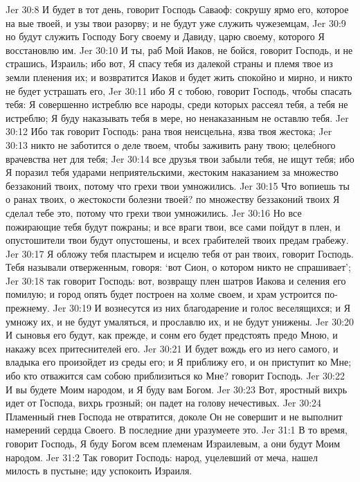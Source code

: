 Jer 30:8  И будет в тот день, говорит Господь Саваоф: сокрушу ярмо его, которое на вые твоей, и узы твои разорву; и не будут уже служить чужеземцам,
Jer 30:9  но будут служить Господу Богу своему и Давиду, царю своему, которого Я восстановлю им.
Jer 30:10  И ты, раб Мой Иаков, не бойся, говорит Господь, и не страшись, Израиль; ибо вот, Я спасу тебя из далекой страны и племя твое из земли пленения их; и возвратится Иаков и будет жить спокойно и мирно, и никто не будет устрашать его,
Jer 30:11  ибо Я с тобою, говорит Господь, чтобы спасать тебя: Я совершенно истреблю все народы, среди которых рассеял тебя, а тебя не истреблю; Я буду наказывать тебя в мере, но ненаказанным не оставлю тебя.
Jer 30:12  Ибо так говорит Господь: рана твоя неисцельна, язва твоя жестока;
Jer 30:13  никто не заботится о деле твоем, чтобы заживить рану твою; целебного врачевства нет для тебя;
Jer 30:14  все друзья твои забыли тебя, не ищут тебя; ибо Я поразил тебя ударами неприятельскими, жестоким наказанием за множество беззаконий твоих, потому что грехи твои умножились.
Jer 30:15  Что вопиешь ты о ранах твоих, о жестокости болезни твоей? по множеству беззаконий твоих Я сделал тебе это, потому что грехи твои умножились.
Jer 30:16  Но все пожирающие тебя будут пожраны; и все враги твои, все сами пойдут в плен, и опустошители твои будут опустошены, и всех грабителей твоих предам грабежу.
Jer 30:17  Я обложу тебя пластырем и исцелю тебя от ран твоих, говорит Господь. Тебя называли отверженным, говоря: `вот Сион, о котором никто не спрашивает';
Jer 30:18  так говорит Господь: вот, возвращу плен шатров Иакова и селения его помилую; и город опять будет построен на холме своем, и храм устроится по-прежнему.
Jer 30:19  И вознесутся из них благодарение и голос веселящихся; и Я умножу их, и не будут умаляться, и прославлю их, и не будут унижены.
Jer 30:20  И сыновья его будут, как прежде, и сонм его будет предстоять предо Мною, и накажу всех притеснителей его.
Jer 30:21  И будет вождь его из него самого, и владыка его произойдет из среды его; и Я приближу его, и он приступит ко Мне; ибо кто отважится сам собою приблизиться ко Мне? говорит Господь.
Jer 30:22  И вы будете Моим народом, и Я буду вам Богом.
Jer 30:23  Вот, яростный вихрь идет от Господа, вихрь грозный; он падет на голову нечестивых.
Jer 30:24  Пламенный гнев Господа не отвратится, доколе Он не совершит и не выполнит намерений сердца Своего. В последние дни уразумеете это.
Jer 31:1  В то время, говорит Господь, Я буду Богом всем племенам Израилевым, а они будут Моим народом.
Jer 31:2  Так говорит Господь: народ, уцелевший от меча, нашел милость в пустыне; иду успокоить Израиля.
